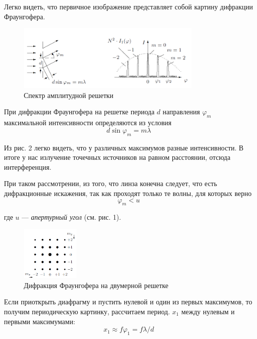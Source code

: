 \documentclass[a4paper,12pt]{report}
\begin{document}
	Легко видеть, что первичное изображение представляет собой картину дифракции Фраунгофера. 
	
	\begin{figure}[h]
		\begin{center}
			\includegraphics[width = 0.8\textwidth]{433-2.png}
			\caption{Спектр амплитудной решетки}
		\end{center}
	\end{figure}
	При дифракции Фраунгофера на решетке периода $d$ направления $\varphi_m$ максимальной интенсивности определяются из условия 
	\begin{equation}
	d \sin \varphi_m = m \lambda
	\end{equation}
	
	Из рис. 2 легко видеть, что у различных максимумов разные интенсивности.
	В итоге у нас излучение точечных источников на равном расстоянии, отсюда интерференция. 
	
	При таком рассмотрении, из того, что линза конечна следует, что есть дифракционные искажения, так как проходят только те волны, для которых верно 
	\begin{equation}
	\varphi_m < u
	\end{equation}
	
	где $u$ --- \textit{апертурный угол} (см. рис. 1).
	
	\begin{figure}
		\begin{center}
			\includegraphics[width = 0.25\textwidth]{433-3.png}
		\end{center}
		\caption{Дифракция Фраунгофера на двумерной решетке}
	\end{figure}
	
	Если приоткрыть диафрагму и пустить нулевой и один из первых максимумов, то получим периодическую картинку, рассчитаем период. $x_1$ между нулевым и первыми максимумами:
	\begin{equation}
	x_1 \approx f \varphi_1 = f \lambda/d
	\end{equation} 
	
\end{document}
